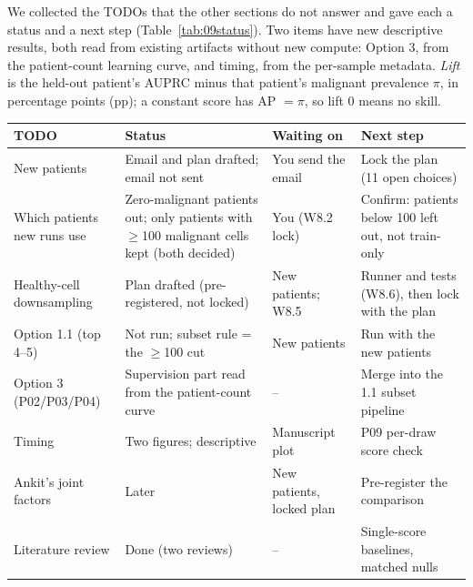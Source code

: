 We collected the TODOs that the other sections do not answer and gave each a status and a next step (Table~\ref{tab:09status}). Two items have new descriptive results, both read from existing artifacts without new compute: Option 3, from the patient-count learning curve, and timing, from the per-sample metadata. \emph{Lift} is the held-out patient's AUPRC minus that patient's malignant prevalence $\pi$, in percentage points (pp); a constant score has AP $= \pi$, so lift 0 means no skill.

\begin{center}
\begin{minipage}{\linewidth}%
\centering
\small
{}
\label{tab:09status}
\begin{tabularx}{\linewidth}{>{\raggedright\arraybackslash}p{2.7cm} >{\raggedright\arraybackslash}X >{\raggedright\arraybackslash}p{2.6cm} >{\raggedright\arraybackslash}X}
\toprule
TODO & Status & Waiting on & Next step \\
\midrule
New patients & Email and plan drafted; email not sent & You send the email & Lock the plan (11 open choices) \\
Which patients new runs use & Zero-malignant patients out; only patients with $\geq$100 malignant cells kept (both decided) & You (W8.2 lock) & Confirm: patients below 100 left out, not train-only \\
Healthy-cell downsampling & Plan drafted (pre-registered, not locked) & New patients; W8.5 & Runner and tests (W8.6), then lock with the plan \\
Option 1.1 (top 4--5) & Not run; subset rule = the $\geq$100 cut & New patients & Run with the new patients \\
Option 3 (P02/P03/P04) & Supervision part read from the patient-count curve & -- & Merge into the 1.1 subset pipeline \\
Timing & Two figures; descriptive & Manuscript plot & P09 per-draw score check \\
Ankit's joint factors & Later & New patients, locked plan & Pre-register the comparison \\
Literature review & Done (two reviews) & -- & Single-score baselines, matched nulls \\
\bottomrule
\end{tabularx}
\end{minipage}
\end{center}

